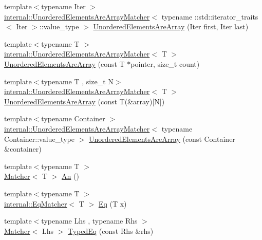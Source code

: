 \begin{DoxyCompactItemize}
\item 
{\footnotesize template$<$typename Iter $>$ }\\\hyperlink{classtesting_1_1internal_1_1UnorderedElementsAreArrayMatcher}{internal\+::\+Unordered\+Elements\+Are\+Array\+Matcher}$<$ typename \+::std\+::iterator\+\_\+traits$<$ Iter $>$\+::value\+\_\+type $>$ \hyperlink{namespacetesting_ab4896081406209171a1596b7028e1cf7}{Unordered\+Elements\+Are\+Array} (Iter first, Iter last)
\item 
{\footnotesize template$<$typename T $>$ }\\\hyperlink{classtesting_1_1internal_1_1UnorderedElementsAreArrayMatcher}{internal\+::\+Unordered\+Elements\+Are\+Array\+Matcher}$<$ T $>$ \hyperlink{namespacetesting_a99b9509a7cd405be28bf45231577384b}{Unordered\+Elements\+Are\+Array} (const T $\ast$pointer, size\+\_\+t count)
\item 
{\footnotesize template$<$typename T , size\+\_\+t N$>$ }\\\hyperlink{classtesting_1_1internal_1_1UnorderedElementsAreArrayMatcher}{internal\+::\+Unordered\+Elements\+Are\+Array\+Matcher}$<$ T $>$ \hyperlink{namespacetesting_a23c7729cfc61967f3271018076c4b724}{Unordered\+Elements\+Are\+Array} (const T(\&array)\mbox{[}N\mbox{]})
\item 
{\footnotesize template$<$typename Container $>$ }\\\hyperlink{classtesting_1_1internal_1_1UnorderedElementsAreArrayMatcher}{internal\+::\+Unordered\+Elements\+Are\+Array\+Matcher}$<$ typename Container\+::value\+\_\+type $>$ \hyperlink{namespacetesting_a72b0ee2217293106fcf4971dc4a59f4c}{Unordered\+Elements\+Are\+Array} (const Container \&container)
\item 
{\footnotesize template$<$typename T $>$ }\\\hyperlink{classtesting_1_1Matcher}{Matcher}$<$ T $>$ \hyperlink{namespacetesting_a48792471ff9cdf5b4f95a4242df7bfbb}{An} ()
\item 
{\footnotesize template$<$typename T $>$ }\\\hyperlink{classtesting_1_1internal_1_1EqMatcher}{internal\+::\+Eq\+Matcher}$<$ T $>$ \hyperlink{namespacetesting_a0cb8ba7eae844c871eccb29e7c81635f}{Eq} (T x)
\item 
{\footnotesize template$<$typename Lhs , typename Rhs $>$ }\\\hyperlink{classtesting_1_1Matcher}{Matcher}$<$ Lhs $>$ \hyperlink{namespacetesting_a57c9aba17aaa27d818e80a1eec81070f}{Typed\+Eq} (const Rhs \&rhs)
\item 

\end{DoxyCompactItemize}
